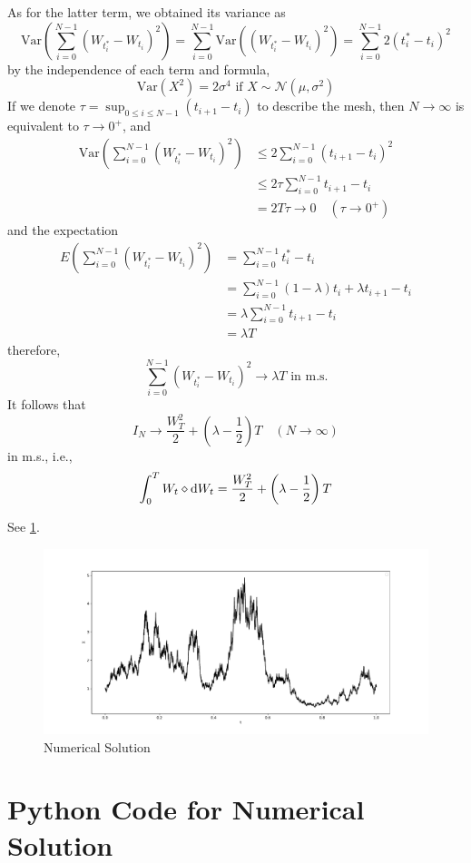\documentclass{homework}
\newcommand{\var}{\mathrm{Var}}
\begin{document}
    As for the latter term, we obtained its variance as
    \[\var\left(\sum_{i=0}^{N-1}(W_{t_i^*}-W_{t_i})^2\right)
    =\sum_{i=0}^{N-1}\var\left((W_{t_i^*}-W_{t_i})^2\right)
    =\sum_{i=0}^{N-1}2(t_i^*-t_i)^2\]
    by the independence of each term and formula,
    \[\var(X^2)=2\sigma^4\text{ if }X\sim\mathcal N(\mu,\sigma^2)\]
    If we denote $\tau=\sup_{0\leq i\leq N-1}(t_{i+1}-t_i)$ to describe
    the mesh, then $N\to\infty$ is equivalent to $\tau\to 0^+$, and
    \[\begin{aligned}
        \var\left(\sum_{i=0}^{N-1}(W_{t_i^*}-W_{t_i})^2\right)
    &\leq 2\sum_{i=0}^{N-1}(t_{i+1}-t_i)^2\\
    &\leq 2\tau\sum_{i=0}^{N-1}t_{i+1}-t_i\\
    &=2T\tau\to 0\quad(\tau\to 0^+)
    \end{aligned}\]
    and the expectation
    \[\begin{aligned}
        E\left(\sum_{i=0}^{N-1}(W_{t_i^*}-W_{t_i})^2\right)
        &=\sum_{i=0}^{N-1}t_i^*-t_i\\
        &=\sum_{i=0}^{N-1}(1-\lambda)t_i+\lambda t_{i+1}-t_i\\
        &=\lambda\sum_{i=0}^{N-1}t_{i+1}-t_{i}\\
        &=\lambda T
    \end{aligned}\]
    therefore,
    \[\sum_{i=0}^{N-1}(W_{t_i^*}-W_{t_i})^2\to\lambda T
    \text{ in m.s.}\]
    It follows that
    \[I_N\to \frac{W_T^2}{2}+\left(\lambda-\frac{1}{2}\right)T
    \quad(N\to\infty)\]
    in m.s., i.e.,
    \[\int_0^TW_t\diamond\mathrm d W_t=
    \frac{W_T^2}{2}+\left(\lambda-\frac{1}{2}\right)T\]

    \problem

    \problem
    See \cref{fig:numerical solution}.
    \begin{figure}[h]
        \centering
        \includegraphics[width=\linewidth]{solution}
        \caption{Numerical Solution}
        \label{fig:numerical solution}
    \end{figure}

    \appendix
    \section{Python Code for Numerical Solution}
    
\end{document}
